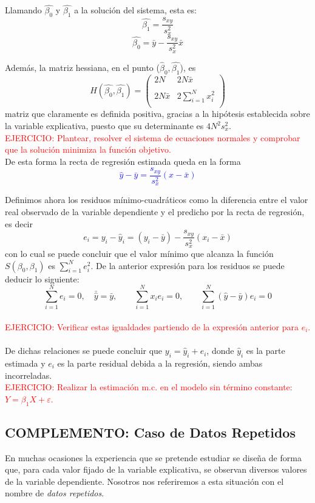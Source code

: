 \documentclass[10pt,a4paper]{book}
\begin{document}
Llamando $\widehat{\beta_0}$ y $\widehat{\beta_1}$ a la solución del sistema, esta es: $$\widehat{\beta_1}=\frac{s_{xy}}{s^2_x}$$ $$\widehat{\beta_0}=\bar{y}-\frac{s_{xy}}{s^2_x}\bar{x}$$

Además, la matriz hessiana, en el punto ($\widehat{\beta}_0,\widehat{\beta_1}$), es $$H(\widehat{\beta_0},\widehat{\beta_1})= \left( \begin{array}{cc}
2N & 2N\bar{x}\\
 & \\
2N\bar{x} & 2\sum^N_{i=1}x^2_i\\
 & 
\end{array} \right)$$ matriz que claramente es definida positiva, gracias a la hipótesis establecida sobre la variable explicativa, puesto que su determinante es $4N^2s^2_x$.
\ \\

\textcolor{red}{EJERCICIO: Plantear, resolver el sistema de ecuaciones normales y comprobar que la solución minimiza la función objetivo.}
\ \\

De esta forma la recta de regresión estimada queda en la forma \textcolor{blue}{$$\widehat{y}-\bar{y}=\frac{s_{xy}}{s^2_x}(x-\bar{x})$$}

Definimos ahora los residuos mínimo-cuadráticos como la diferencia entre el valor real observado de la variable dependiente y el predicho por la recta de regresión, es decir $$e_i=y_i-\widehat{y}_i=(y_i-\bar{y})-\frac{s_{xy}}{s^2_x}(x_i-\bar{x})$$ con lo cual se puede concluir que el valor mínimo que alcanza la función $S(\beta_0,\beta_1)$ es $\sum^N_{i=1}e^2_i$.
De la anterior expresión para los residuos se puede deducir lo siguiente: $$\sum^N_{i=1}e_i=0,\quad \bar{\widehat{y}}=\bar{y},\qquad \sum^N_{i=1}x_ie_i=0,\qquad \sum^N_{i=1}(\widehat{y}-\bar{y})e_i=0$$
\ \\

\textcolor{red}{EJERCICIO: Verificar estas igualdades partiendo de la expresión anterior para $e_i$.} 
\ \\

De dichas relaciones se puede concluir que $y_i=\widehat{y}_i + e_i$, donde $\widehat{y}_i$ es la parte estimada y $e_i$ es la parte residual debida a la regresión, siendo ambas incorreladas.
\ \\

\textcolor{red}{EJERCICIO: Realizar la estimación m.c. en el modelo sin término constante: $Y = \beta_1X + \varepsilon$.}
		\subsection*{COMPLEMENTO: Caso de Datos Repetidos}
En muchas ocasiones la experiencia que se pretende estudiar se diseña de forma que, para cada valor fijado de la variable explicativa, se observan diversos valores de la variable dependiente. Nosotros nos referiremos a esta situación con el nombre de \textit{datos repetidos}.
\end{document}
